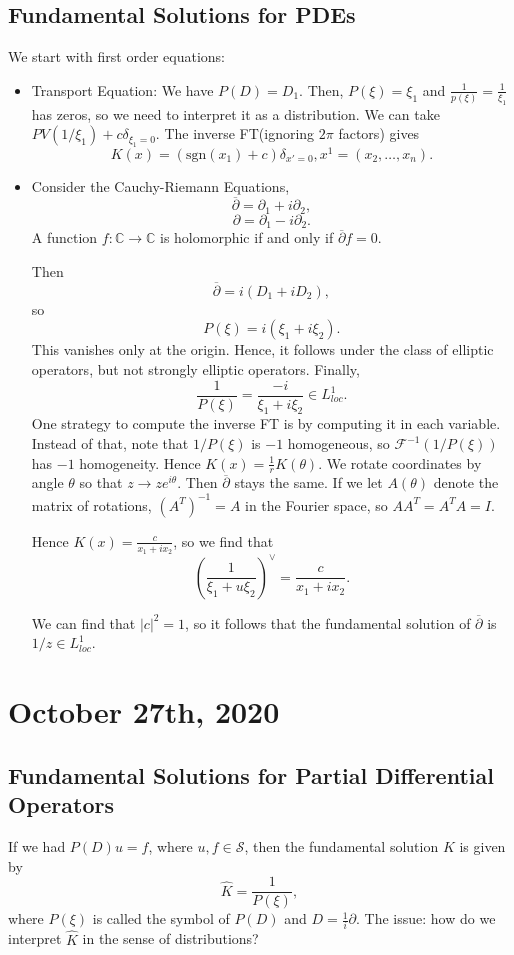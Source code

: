 \documentclass[12pt]{scrartcl}
\newcommand{\C}{\mathbb C}
\renewcommand{\hat}{\widehat}
\begin{document}
\subsection{Fundamental Solutions for PDEs}
We start with first order equations: 
\begin{itemize}
\item Transport Equation: We have $P(D) = D_1$.  Then, $P(\xi) =\xi_1$ and 
$\frac{1}{p(\xi)} = \frac{1}{\xi_1}$ has zeros, so we need to interpret it as a distribution.  We can take $PV(1/\xi_1) + c\delta_{\xi_1 = 0}.$  The inverse FT(ignoring $2\pi$ factors) gives 
$$K(x) =(\text{sgn}(x_1) + c)\delta_{x' = 0}, x^1 = (x_2,\dots, x_n).$$
\item Consider the Cauchy-Riemann Equations,
$$\overline{\partial} = \partial_1 + i\partial_2,$$
$$\partial = \partial_1 - i\partial_2.$$
A function $f: \C \to \C$ is holomorphic if and only if $\overline{\partial} f = 0$.

Then 
$$\overline{\partial} = i(D_1 + iD_2),$$
so 
$$P(\xi) = i(\xi_1 + i\xi_2).$$
This vanishes only at the origin.  Hence, it follows under the class of elliptic operators, but not strongly elliptic operators.
Finally,
$$\frac{1}{P(\xi)} = \frac{-i}{\xi_1 + i\xi_2} \in L_{loc}^1.$$
One strategy to compute the inverse FT is by computing it in each variable.  Instead of that, note that $1/P(\xi)$ is $-1$ homogeneous, so $\mathcal F^{-1}(1/P(\xi))$ has $-1$ homogeneity.  
Hence $K(x) = \frac{1}{r}K(\theta)$.  We rotate coordinates by angle $\theta$ so that $z \to ze^{i\theta}$.  Then $\overline{\partial}$ stays the same.  If we let $A(\theta)$ denote the matrix of rotations, $(A^T)^{-1} = A$ in the Fourier space, so $AA^T = A^TA = I$.

Hence $K(x) = \frac{c}{x_1 + ix_2}$, so we find that 
$$\left (\frac{1}{\xi_1 + u\xi_2}\right )^\vee = \frac{c}{x_1 + ix_2}.$$

We can find that $|c|^2 = 1$, so it follows that the fundamental solution of $\overline{\partial}$ is $1/z \in L_{loc}^1$.  
\end{itemize}
\pagebreak
\section{October 27th, 2020}
\subsection{Fundamental Solutions for Partial Differential Operators}
If we had $P(D)u = f$, where $u, f \in \mathcal S$, then the fundamental solution $K$ is given by 
$$\hat{K} = \frac{1}{P(\xi)},$$
where $P(\xi)$ is called the symbol of $P(D)$ and $D = \frac{1}{i}\partial$.  The issue: how do we interpret $\hat{K}$ in the sense of distributions?
\end{document}
